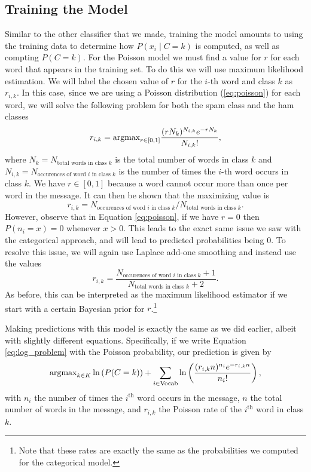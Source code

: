 \subsection*{Training the Model}
Similar to the other classifier that we made, training the model amounts to using the training data to determine how $P(x_i \mid C=k)$ is computed, as well as compting $P(C=k)$.
For the Poisson model we must find a value for $r$ for each word that appears in the training set.
To do this we will use maximum likelihood estimation.
We will label the chosen value of $r$ for the $i$-th word and class $k$ as $r_{i,k}$.
In this case, since we are using a Poisson distribution (\ref{eq:poisson}) for each word, we will solve the following problem for both the spam class and the ham classes
\begin{equation}\label{eq:MLE}
    r_{i,k} = \mbox{argmax}_{r\in[0,1]}\frac{(rN_k)^{N_{i,k}}e^{-rN_k}}{N_{i,k}!},
\end{equation}
where $N_k=N_\text{total words in class $k$}$ is the total number of words in class $k$ and $N_{i,k}=N_\text{occurences of word $i$ in class $k$}$ is the number of times the $i$-th word occurs in class $k$.
We have $r\in[0,1]$ because a word cannot occur more than once per word in the message.
It can then be shown that the maximizing value is
\[
r_{i,k} = N_\text{occurences of word $i$ in class $k$}
 / N_\text{total words in class $k$}.
\]
However, observe that in Equation \eqref{eq:poisson}, if we have $r=0$ then $P(n_i=x)=0$ whenever $x>0$.
This leads to the exact same issue we saw with the categorical approach, and will lead to predicted probabilities being 0.
To resolve this issue, we will again use Laplace add-one smoothing and instead use the values 
\begin{equation}\label{eq:normalized_r}
    r_{i,k} = \frac{N_\text{occurences of word $i$ in class $k$}+1}
{N_\text{total words in class $k$}+2}.
\end{equation}
As before, this can be interpreted as the maximum likelihood estimator if we start with a certain Bayesian prior for $r$.\footnote{Note that these rates are exactly the same as the probabilities we computed for the categorical model.}

Making predictions with this model is exactly the same as we did earlier, albeit with slightly different equations.
Specifically, if we write Equation \ref{eq:log_problem} with the Poisson probability, our prediction is given by
\begin{equation}\label{eq:poisson_prob}
\mbox{argmax}_{k\in K}\ln\left(P(C=k)\right) + 
\sum_{i\in\text{Vocab}}
\ln\left(\frac{(r_{i,k}n)^{n_i}e^{-r_{i,k}n}}{n_i!}\right),
\end{equation}
with $n_i$ the number of times the $i^{\text{th}}$ word occurs in the message, $n$ the total number of words in the message, and $r_{i,k}$ the Poisson rate of the $i^{\text{th}}$ word in class $k$.

